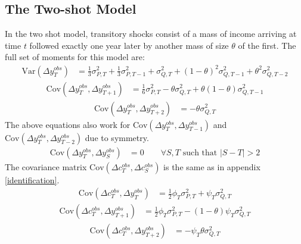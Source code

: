 \subsection{The Two-shot Model}
In the two shot model, transitory shocks consist of a mass of income arriving at time $t$ followed exactly one year later by another mass of size $\theta$ of the first. The full set of moments for this model are:
\begin{align}
\mathrm{Var}(\Delta y^{obs}_T) &= \frac{1}{3}\sigma^2_{P,T} + \frac{1}{3}\sigma^2_{P,T-1} +  \sigma^2_{Q,T}   +(1-\theta)^2 \sigma^2_{Q,T-1} + \theta^2\sigma^2_{Q,T-2}
\end{align}
\begin{align}
\mathrm{Cov}(\Delta y^{obs}_T, \Delta y^{obs}_{T+1}) &= \frac{1}{6}\sigma^2_{P,T}  -\theta \sigma^2_{Q,T}  +\theta (1-\theta) \sigma^2_{Q,T-1}
\end{align}
\begin{align}
\mathrm{Cov}(\Delta y^{obs}_T, \Delta y^{obs}_{T+2})&= -\theta \sigma^2_{Q,T}
\end{align}
The above equations also work for $\mathrm{Cov}(\Delta y^{obs}_T, \Delta y^{obs}_{T-1})$ and $\mathrm{Cov}(\Delta y^{obs}_T, \Delta y^{obs}_{T-2})$ due to symmetry.
\begin{align}
\mathrm{Cov}(\Delta y^{obs}_T, \Delta y^{obs}_{S}) &= 0 \qquad \forall S,T \text{ such that }|S-T| >2 
\end{align}
The covariance matrix $\mathrm{Cov}(\Delta c^{obs}_T, \Delta c^{obs}_{S})$ is the same as in appendix \ref{identification}.
\begin{align}
\mathrm{Cov}(\Delta c^{obs}_T, \Delta y^{obs}_T) &= \frac{1}{2} \phi_T \sigma^2_{P,T} + \psi_T \sigma^2_{Q,T} 
\end{align}
\begin{align}
\mathrm{Cov}(\Delta c^{obs}_T, \Delta y^{obs}_{T+1})&= \frac{1}{2} \phi_T \sigma^2_{P,T} - (1-\theta) \psi_T \sigma^2_{Q,T} 
\end{align}
\begin{align}
\mathrm{Cov}(\Delta c^{obs}_T, \Delta y^{obs}_{T+2}) &= -\psi_T  \theta \sigma^2_{Q,T}
\end{align}